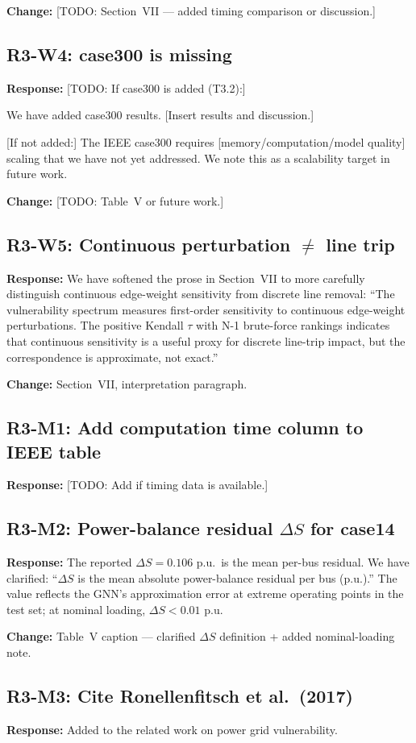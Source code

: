 \documentclass[11pt]{article}
\newcommand{\reviewer}[1]{\subsection*{\textcolor{revcolor}{#1}}}
\newcommand{\response}[1]{\textcolor{responsecolor}{\textbf{Response:} #1}}
\newcommand{\change}[1]{\textcolor{changecolor}{\textbf{Change:} #1}}
\begin{document}
\change{[TODO: Section~VII --- added timing comparison or discussion.]}


\reviewer{R3-W4: case300 is missing}

\response{
[TODO: If case300 is added (T3.2):]

We have added case300 results. [Insert results and discussion.]

[If not added:] The IEEE case300 requires [memory/computation/model quality] scaling that we have not yet addressed. We note this as a scalability target in future work.
}

\change{[TODO: Table~V or future work.]}


\reviewer{R3-W5: Continuous perturbation $\neq$ line trip}

\response{
We have softened the prose in Section~VII to more carefully distinguish continuous edge-weight sensitivity from discrete line removal: ``The vulnerability spectrum measures first-order sensitivity to continuous edge-weight perturbations. The positive Kendall $\tau$ with N-1 brute-force rankings indicates that continuous sensitivity is a useful proxy for discrete line-trip impact, but the correspondence is approximate, not exact.''
}

\change{Section~VII, interpretation paragraph.}


\reviewer{R3-M1: Add computation time column to IEEE table}

\response{[TODO: Add if timing data is available.]}

\reviewer{R3-M2: Power-balance residual $\Delta S$ for case14}

\response{
The reported $\Delta S = 0.106$ p.u.\ is the mean per-bus residual. We have clarified: ``$\Delta S$ is the mean absolute power-balance residual per bus (p.u.).'' The value reflects the GNN's approximation error at extreme operating points in the test set; at nominal loading, $\Delta S < 0.01$ p.u.
}

\change{Table~V caption --- clarified $\Delta S$ definition + added nominal-loading note.}

\reviewer{R3-M3: Cite Ronellenfitsch et al.\ (2017)}

\response{Added to the related work on power grid vulnerability.}
\end{document}
